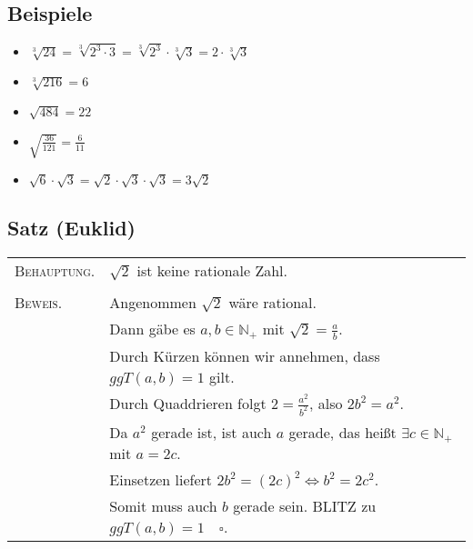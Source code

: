 	
\subsection{Beispiele}

	\begin{itemize}
	
		\item $\sqrt[3]{24}=\sqrt[3]{2^3\cdot 3}=\sqrt[3]{2^3}\cdot\sqrt[3]{3}
		=2\cdot\sqrt[3]{3}$
		\item $\sqrt[3]{216}=6$	
		\item $\sqrt{484}=22$
		\item $\sqrt{\frac{36}{121}}=\frac{6}{11}$
		\item $\sqrt{6}\cdot\sqrt{3}=\sqrt{2}\cdot\sqrt{3}\cdot\sqrt{3}=3\sqrt{2}$	
	
	\end{itemize}
	
	
\subsection[Irrationalitätsbeweis von $\sqrt{2}$ nach Euklid]{Satz (Euklid)}
	
	\begin{tabular}{ll}	

	\textsc{Behauptung.} 	& $\sqrt{2}$ ist keine rationale Zahl.\\
							& \\
	\textsc{Beweis.} 		& Angenommen $\sqrt{2}$ wäre rational.\\
							& Dann gäbe es $a,b\in\mathbb{N_+}$ mit $\sqrt{2}=\frac{a}{b}$.\\
							& Durch Kürzen können wir annehmen, dass $ggT(a,b)=1$ gilt.\\
							& Durch Quaddrieren folgt $2=\frac{a^2}{b^2}$, also $2b^2=a^2$.\\
							& Da $a^2$ gerade ist, ist auch $a$ gerade,
							das heißt $\exists c\in\mathbb{N_+}$ mit $a=2c$.\\
							& Einsetzen liefert $2b^2=(2c)^2\Leftrightarrow b^2=2c^2$.\\
							& Somit muss auch $b$ gerade sein.
							BLITZ zu $ggT(a,b)=1\quad\square$.
	\end{tabular}

